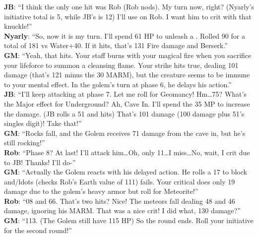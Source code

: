 \begin{multimog}
\textbf{JB}: \enquote{I think the only one hit was Rob (Rob nods). My turn now, right? (Nyarly's initiative total is 5, while JB's is 12) I'll use  on Rob. I want him to crit with that knuckle!} \\
\textbf{Nyarly}: \enquote{So, now it is my turn. I'll spend 61 HP to unleash a . Rolled 90 for a total of 181 vs Water+40. If it hits, that's 131 Fire damage and Berserk.} \\
\textbf{GM}: \enquote{Yeah, that hits. Your staff burns with your magical fire when you sacrifice your lifeforce to summon a cleansing flame. Your strike hits true, dealing 101 damage (that's 121 minus the 30 MARM), but the creature seems to be immune to your mental effect. In the golem's turn at phase 6, he delays his action.} \\
\textbf{JB}: \enquote{I'll keep attacking at phase 7. Let me roll for Geomancy! Hm\ldots 75? What’s the Major effect for Underground? Ah, Cave In. I'll spend the 35 MP to increase the damage. (JB rolls a 51 and hits) That's 101 damage (100 damage plus 51's singles digit)! Take that!} \\
\textbf{GM}: \enquote{Rocks fall, and the Golem receives 71 damage from the cave in, but he's still rocking!} \\
\textbf{Rob}: \enquote{Phase 8? At last! I'll attack him\ldots Oh, only 11\ldots I miss\ldots No, wait, I crit due to JB! Thanks! I'll do-} \\
\textbf{GM}: \enquote{Actually the Golem reacts with his delayed action. He rolls a 17 to block and/ldots (checks Rob's Earth value of 111) fails. Your critical does only 19 damage due to the golem's heavy armor but roll for Meteorite!} \\
\textbf{Rob}: \enquote{08 and 66. That's two hits? Nice! The meteors fall dealing 48 and 46 damage, ignoring his MARM. That was a nice crit! I did what, 130 damage?} \\
\textbf{GM}: \enquote{113. (The Golem still have 115 HP) So the round ends. Roll your initiative for the second round!} \\ 
\end{multimog}

